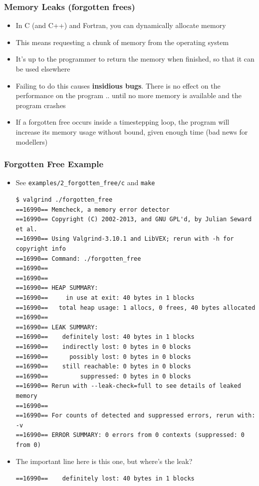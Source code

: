 \documentclass{beamer}
\begin{document}
\begin{frame}[fragile]
  \frametitle{Memory Leaks (forgotten frees)}
  \begin{itemize}
    \item In C (and C++) and Fortran, you can dynamically allocate memory
      \item This means requesting a chunk of memory from the operating system
      \item It's up to the programmer to return the memory when finished, so that it can be used elsewhere
      \item Failing to do this causes {\bf insidious bugs}. There is no effect on the performance on the program .. until no more memory is available and the program crashes
      \item If a forgotten free occurs inside a timestepping loop, the program will increase its memory usage without bound, given enough time (bad news for modellers)
  \end{itemize}
\end{frame}

\begin{frame}[fragile]
  \frametitle{Forgotten Free Example} 
  \begin{itemize}
    \item See \texttt{examples/2\_forgotten\_free/c} and \texttt{make}
  \begin{lstlisting}
$ valgrind ./forgotten_free
==16990== Memcheck, a memory error detector
==16990== Copyright (C) 2002-2013, and GNU GPL'd, by Julian Seward et al.
==16990== Using Valgrind-3.10.1 and LibVEX; rerun with -h for copyright info
==16990== Command: ./forgotten_free
==16990==
==16990==
==16990== HEAP SUMMARY:
==16990==     in use at exit: 40 bytes in 1 blocks
==16990==   total heap usage: 1 allocs, 0 frees, 40 bytes allocated
==16990==
==16990== LEAK SUMMARY:
==16990==    definitely lost: 40 bytes in 1 blocks
==16990==    indirectly lost: 0 bytes in 0 blocks
==16990==      possibly lost: 0 bytes in 0 blocks
==16990==    still reachable: 0 bytes in 0 blocks
==16990==         suppressed: 0 bytes in 0 blocks
==16990== Rerun with --leak-check=full to see details of leaked memory
==16990==
==16990== For counts of detected and suppressed errors, rerun with: -v
==16990== ERROR SUMMARY: 0 errors from 0 contexts (suppressed: 0 from 0)
  \end{lstlisting}
\item The important line here is this one, but where's the leak?
\begin{lstlisting}
==16990==    definitely lost: 40 bytes in 1 blocks
\end{lstlisting}
\end{itemize}
\end{frame}
\end{document}
